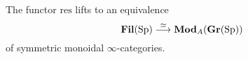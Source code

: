 \begin{lem} \label{lem:FilAsGrMod}
The functor $\mathrm{res}$ lifts to an equivalence
$$\operatorname{\mathbf{Fil}}(\operatorname{\mathrm{Sp}}) \stackrel{\simeq}{\longrightarrow} \textbf{Mod}_{A}(\operatorname{\mathbf{Gr}}(\operatorname{\mathrm{Sp}}))$$
of symmetric monoidal $\infty$-categories.
\end{lem}








